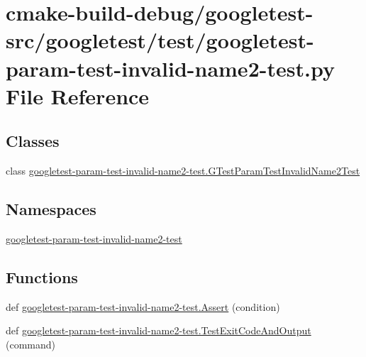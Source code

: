 \hypertarget{googletest-param-test-invalid-name2-test_8py}{}\section{cmake-\/build-\/debug/googletest-\/src/googletest/test/googletest-\/param-\/test-\/invalid-\/name2-\/test.py File Reference}
\label{googletest-param-test-invalid-name2-test_8py}
\subsection*{Classes}
\begin{DoxyCompactItemize}
\item 
class \mbox{\hyperlink{classgoogletest-param-test-invalid-name2-test_1_1GTestParamTestInvalidName2Test}{googletest-\/param-\/test-\/invalid-\/name2-\/test.\+G\+Test\+Param\+Test\+Invalid\+Name2\+Test}}
\end{DoxyCompactItemize}
\subsection*{Namespaces}
\begin{DoxyCompactItemize}
\item 
 \mbox{\hyperlink{namespacegoogletest-param-test-invalid-name2-test}{googletest-\/param-\/test-\/invalid-\/name2-\/test}}
\end{DoxyCompactItemize}
\subsection*{Functions}
\begin{DoxyCompactItemize}
\item 
def \mbox{\hyperlink{namespacegoogletest-param-test-invalid-name2-test_abce82484b5e340c0951436eab006fa2e}{googletest-\/param-\/test-\/invalid-\/name2-\/test.\+Assert}} (condition)
\item 
def \mbox{\hyperlink{namespacegoogletest-param-test-invalid-name2-test_a6897220a9a1986dd4bbef1ca9f0629bd}{googletest-\/param-\/test-\/invalid-\/name2-\/test.\+Test\+Exit\+Code\+And\+Output}} (command)
\end{DoxyCompactItemize}
